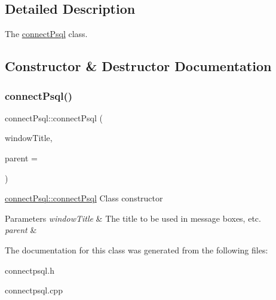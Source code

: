 \subsection{Detailed Description}
The \hyperlink{classconnect_psql}{connect\+Psql} class. 

\subsection{Constructor \& Destructor Documentation}
\mbox{\label{classconnect_psql_aee2b55cd64f5b2fac084eda4e6db0075}} 
\subsubsection{\texorpdfstring{connect\+Psql()}{connectPsql()}}
{\footnotesize\ttfamily connect\+Psql\+::connect\+Psql (\begin{DoxyParamCaption}\item[{Q\+String}]{window\+Title,  }\item[{Q\+Widget $\ast$}]{parent = {} }\end{DoxyParamCaption})\hspace{0.3cm}{\ttfamily [explicit]}}



\hyperlink{classconnect_psql_aee2b55cd64f5b2fac084eda4e6db0075}{connect\+Psql\+::connect\+Psql} Class constructor 


\begin{DoxyParams}{Parameters}
{\em window\+Title} & The title to be used in message boxes, etc. \\
\hline
{\em parent} & \\
\hline
\end{DoxyParams}


The documentation for this class was generated from the following files\+:\begin{DoxyCompactItemize}
\item 
connectpsql.\+h\item 
connectpsql.\+cpp\end{DoxyCompactItemize}
